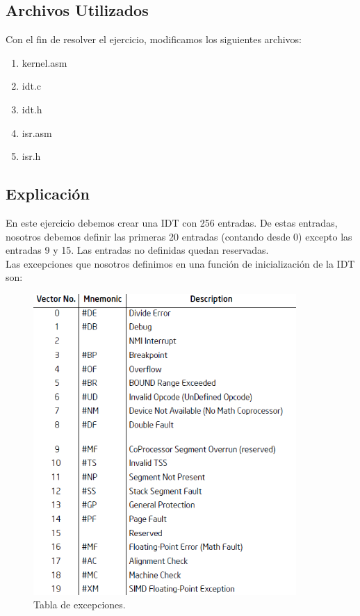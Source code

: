 \documentclass[a4paper]{article}
\begin{document}
\subsection{Archivos Utilizados}

Con el fin de resolver el ejercicio, modificamos los siguientes archivos:

\begin{enumerate}

\item kernel.asm
\item idt.c
\item idt.h
\item isr.asm
\item isr.h

\end{enumerate}



\subsection{Explicación}
En este ejercicio debemos crear una IDT con 256 entradas. De estas entradas, nosotros debemos definir las primeras 20 entradas (contando desde 0) excepto las entradas 9 y 15. Las entradas no definidas quedan reservadas.\\
Las excepciones que nosotros definimos en una función de inicialización de la IDT son:
\begin{figure}[ht!]
\centering
\includegraphics[width=100mm]{imagenes/Excepciones.png}
\caption {Tabla de excepciones.}
\end{figure}
\end{document}
